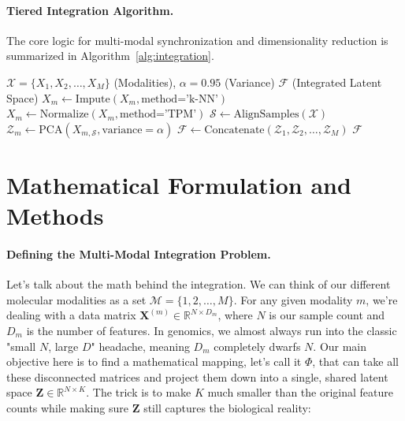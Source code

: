 \documentclass[12pt,a4paper,onecolumn]{article}
\begin{document}
\paragraph{Tiered Integration Algorithm.}
The core logic for multi-modal synchronization and dimensionality reduction is summarized in Algorithm~\ref{alg:integration}.

\begin{algorithm}[H]
\caption{Tiered Multi-Omics Integration.}\label{alg:integration}
\begin{algorithmic}[1]
\REQUIRE $\mathcal{X} = \{X_1, X_2, \dots, X_M\}$ (Modalities), $\alpha = 0.95$ (Variance)
\ENSURE $\mathcal{F}$ (Integrated Latent Space)
    \STATE $X_m \gets \text{Impute}(X_m, \text{method='k-NN'})$
    \STATE $X_m \gets \text{Normalize}(X_m, \text{method='TPM'})$
\ENDFOR
\STATE $\mathcal{S} \gets \text{AlignSamples}(\mathcal{X})$
    \STATE $\mathcal{Z}_m \gets \text{PCA}(X_{m, \mathcal{S}}, \text{variance}=\alpha)$
\ENDFOR
\STATE $\mathcal{F} \gets \text{Concatenate}(\mathcal{Z}_1, \mathcal{Z}_2, \dots, \mathcal{Z}_M)$
\RETURN $\mathcal{F}$
\end{algorithmic}
\end{algorithm}

\section{Mathematical Formulation and Methods}

\paragraph{Defining the Multi-Modal Integration Problem.}
Let's talk about the math behind the integration. We can think of our different molecular modalities as a set $\mathcal{M} = \{1, 2, \ldots, M\}$. For any given modality $m$, we're dealing with a data matrix $\mathbf{X}^{(m)} \in \mathbb{R}^{N \times D_m}$, where $N$ is our sample count and $D_m$ is the number of features. In genomics, we almost always run into the classic "small $N$, large $D$" headache, meaning $D_m$ completely dwarfs $N$. Our main objective here is to find a mathematical mapping, let's call it $\Phi$, that can take all these disconnected matrices and project them down into a single, shared latent space $\mathbf{Z} \in \mathbb{R}^{N \times K}$. The trick is to make $K$ much smaller than the original feature counts while making sure $\mathbf{Z}$ still captures the biological reality:
\end{document}
